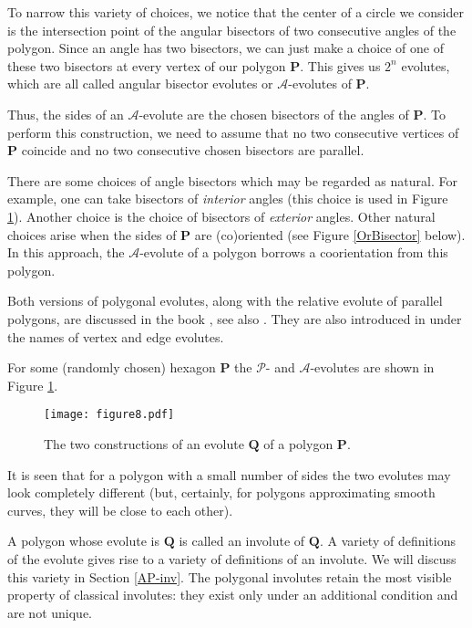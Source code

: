 \documentclass[12pt]{article}
\newcommand{\Pev}{\mathcal{P}}
\newcommand{\Aev}{\mathcal{A}}
\renewcommand{\P}{\mathbf{P}}
\begin{document}
To narrow this variety of choices, we notice that the center of a circle we consider is the intersection point of the angular bisectors of two consecutive angles of the polygon. Since an angle has two bisectors, we can just make a choice of one of these two bisectors at every vertex of our polygon $\P$. This gives us $2^n$ evolutes, which are all called angular bisector evolutes or $\Aev$-evolutes of $\P$. 

Thus, the sides of an $\Aev$-evolute are the chosen bisectors of the angles of $\P$. To perform this construction, we need to assume that no two consecutive vertices of $\P$ coincide and no two consecutive chosen bisectors are parallel. 

There are some choices of angle bisectors which may be regarded as natural. For example, one can take bisectors of {\it interior} angles (this choice is used in Figure \ref{hexagonexample}). Another choice is the choice of bisectors of {\it exterior} angles. Other natural choices arise when the sides of $\P$ are (co)oriented (see Figure \ref{OrBisector} below). In this approach, the $\Aev$-evolute of a polygon borrows a coorientation from this polygon.

Both versions of polygonal evolutes, along with the relative evolute of parallel polygons, are discussed in the book \cite{Pa}, see also \cite{Ta}. They are also introduced in \cite{Ho} under the names of vertex and edge evolutes.

For some (randomly chosen) hexagon $\P$ the $\Pev$- and $\Aev$-evolutes
are shown in Figure \ref{hexagonexample}.

\begin{figure}[hbtp]
	\centering
	\texttt{[image: figure8.pdf]}
	\caption{The two constructions of an evolute $\mathbf{Q}$ of a polygon $\P$.}
	\label{hexagonexample}
\end{figure}

It is seen that for a polygon with a small number of sides the two evolutes  may look completely different (but, certainly, for polygons approximating smooth curves, they will be close to each other).

A polygon whose evolute is $\mathbf Q$ is called an involute of $\mathbf Q$. A variety of definitions of the evolute gives rise to a variety of definitions of an involute. We will discuss this variety in Section \ref{AP-inv}. The polygonal involutes retain the most visible property of classical involutes: they exist only under an additional condition and are not unique.
\end{document}
